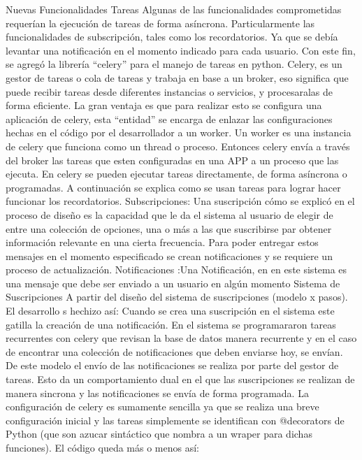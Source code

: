 Nuevas Funcionalidades
Tareas
Algunas de las funcionalidades comprometidas requerían la ejecución de tareas de forma asíncrona. Particularmente las funcionalidades de subscripción, tales como los recordatorios. Ya que se debía levantar una notificación en el momento indicado para cada usuario.
Con este fin, se agregó la librería “celery” para el manejo de tareas en python.
Celery, es un gestor de tareas o cola de tareas y trabaja en base a un broker, eso significa que puede recibir tareas desde diferentes instancias o servicios, y procesaralas de forma eficiente.
La gran ventaja es que para realizar esto se configura una aplicación de celery, esta “entidad” se encarga de enlazar las configuraciones hechas en el código por el desarrollador a un worker. Un worker es una instancia de celery que funciona como un thread o proceso. Entonces celery envía a través del broker las tareas que esten configuradas en una APP a un proceso que las ejecuta. En celery se pueden ejecutar tareas directamente, de forma asíncrona o programadas.
A continuación se explica como se usan tareas para lograr hacer funcionar los recordatorios.
Subscripciones: Una suscripción cómo se explicó en el proceso de diseño es la capacidad que le da el sistema al usuario de elegir de entre una colección de opciones, una o más a las que suscribirse par obtener información relevante en una cierta frecuencia. Para poder entregar estos mensajes en el momento especificado se crean notificaciones y se requiere un proceso de actualización.
Notificaciones :Una Notificación, en en este sistema es una mensaje que debe ser enviado a un usuario en algún momento
Sistema de Suscripciones
A partir del diseño del sistema de suscripciones (modelo x pasos). El desarrollo s hechizo así:
Cuando se crea una suscripción en el sistema este gatilla la creación de una notificación.
En el sistema se programararon tareas recurrentes con celery que revisan la base de datos manera recurrente y en el caso de encontrar una colección de notificaciones que deben enviarse hoy, se envían. 
De este modelo el envío de las notificaciones se realiza por parte del gestor de tareas.
Esto da un comportamiento dual en el que las suscripciones se realizan de manera sincrona y las notificaciones se envía de forma programada.
La configuración de celery es sumamente sencilla ya que se realiza una breve configuración inicial y las tareas simplemente se identifican con @decorators de Python (que son azucar sintáctico que nombra a un wraper para dichas funciones). 
El código queda más o menos así:

